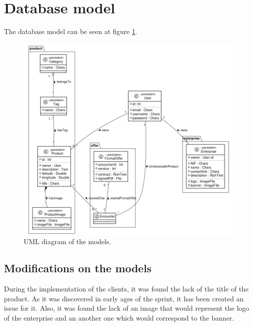 \documentclass[./main.tex]{subfiles}
\begin{document}
\section{Database model}
The database model can be seen at figure \ref{fig:model-uml}.

\begin{figure}[H]
\centering
\includegraphics[width=\linewidth]{img/database-model-new.png}
\caption{UML diagram of the models.}
\label{fig:model-uml}
\end{figure}

\subsection{Modifications on the models}
During the implementation of the clients, it was found the lack of the title of the product. As it was discovered in early ages of the sprint, it has been created an issue for it. Also, it was found the lack of an image that would represent the logo of the enterprise and an another one which would correspond to the banner.
\end{document}
